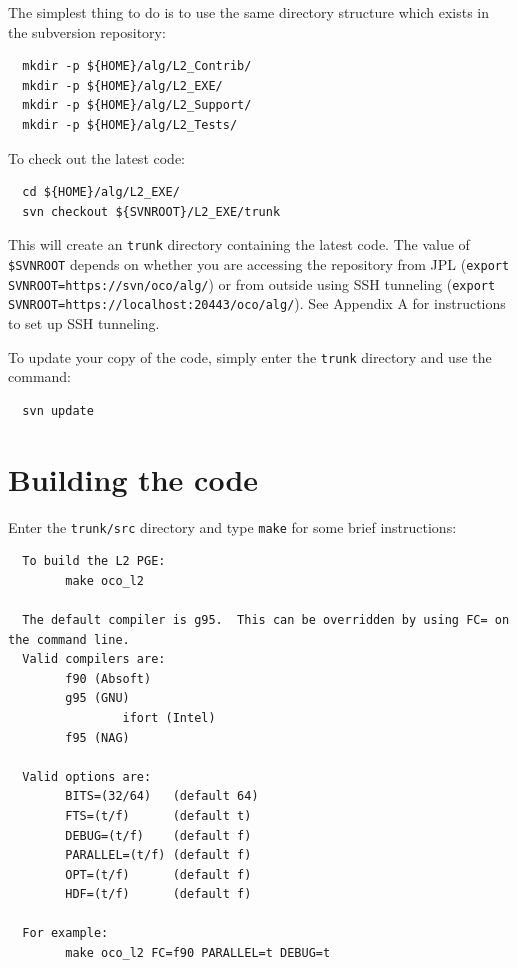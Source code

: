 \documentclass{article}
\begin{document}
The simplest thing to do is to use the same directory structure which
exists in the subversion repository:

\begin{verbatim}
  mkdir -p ${HOME}/alg/L2_Contrib/
  mkdir -p ${HOME}/alg/L2_EXE/
  mkdir -p ${HOME}/alg/L2_Support/
  mkdir -p ${HOME}/alg/L2_Tests/
\end{verbatim}

To check out the latest code:

\begin{verbatim}
  cd ${HOME}/alg/L2_EXE/
  svn checkout ${SVNROOT}/L2_EXE/trunk
\end{verbatim}

This will create an \texttt{trunk} directory containing the latest
code.  The value of \texttt{\${SVNROOT}} depends on whether you are
accessing the repository from JPL (\texttt{export
SVNROOT=https://svn/oco/alg/}) or from outside using SSH tunneling
(\texttt{export SVNROOT=https://localhost:20443/oco/alg/}).  See
Appendix A for instructions to set up SSH tunneling.

To update your copy of the code, simply enter the \texttt{trunk} directory
and use the command:

\begin{verbatim}
  svn update
\end{verbatim}

\section{Building the code}

Enter the \texttt{trunk/src} directory and type \texttt{make} for some
brief instructions:

\begin{verbatim}
  To build the L2 PGE:
        make oco_l2

  The default compiler is g95.  This can be overridden by using FC= on the command line.
  Valid compilers are: 
        f90 (Absoft)
        g95 (GNU)
				ifort (Intel)
        f95 (NAG)

  Valid options are:
        BITS=(32/64)   (default 64)
        FTS=(t/f)      (default t)
        DEBUG=(t/f)    (default f)
        PARALLEL=(t/f) (default f)
        OPT=(t/f)      (default f)
        HDF=(t/f)      (default f)

  For example:
        make oco_l2 FC=f90 PARALLEL=t DEBUG=t

\end{verbatim}
\end{document}
